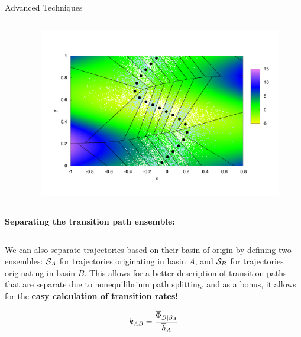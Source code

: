\documentclass[final]{beamer}
\begin{document}
\begin{columns}[t]
\begin{column}{.25 \linewidth}
\begin{block}{Advanced Techniques}
\begin{columns}[t]
\begin{column}{.65\linewidth}
	    \end{column}
	    \begin{column}{.25\linewidth}
	      \begin{figure}
		\includegraphics[width=3 in]{images/whiteandblue.pdf}
	      \end{figure}
	    \end{column}
	  \end{columns}
	  \vspace{30 mm}
	  \textbf{Separating the transition path ensemble:}

	  \begin{columns}[t]
	    \begin{column}{.65\linewidth}

	      We can also separate trajectories based on their basin of origin by defining two ensembles:  ${\cal S}_A$ for trajectories originating in basin $A$, and ${\cal S}_B$ for trajectories originating in basin $B$.
	  This allows for a better description of transition paths that are separate due to nonequilibrium path splitting, and as a bonus, it allows for the \textbf{easy calculation of transition rates!}

	  \begin{equation*}
	    \label{eq:rate}
	    k_{AB} = \frac{\overline{\Phi}_{B \mid {\cal S}_A}}{\overline{h}_A}
	  \end{equation*}


\end{column}
\end{columns}
\end{block}
\end{column}
\end{columns}
\end{document}
